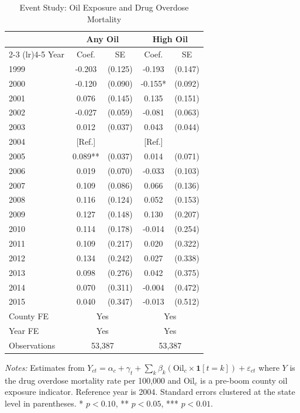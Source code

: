 \begin{table}[H]
\centering
\caption{Event Study: Oil Exposure and Drug Overdose Mortality}
\begin{threeparttable}
\begin{tabular}{lcccc}
\toprule
 & \multicolumn{2}{c}{Any Oil} & \multicolumn{2}{c}{High Oil} \\
 \cmidrule(lr){2-3} \cmidrule(lr){4-5}
Year & Coef. & SE & Coef. & SE \\
\midrule
1999 & -0.203 & (0.125) & -0.193 & (0.147) \\
2000 & -0.120 & (0.090) & -0.155* & (0.092) \\
2001 & 0.076 & (0.145) & 0.135 & (0.151) \\
2002 & -0.027 & (0.059) & -0.081 & (0.063) \\
2003 & 0.012 & (0.037) & 0.043 & (0.044) \\
2004 & [Ref.] & & [Ref.] & \\
2005 & 0.089** & (0.037) & 0.014 & (0.071) \\
2006 & 0.019 & (0.070) & -0.033 & (0.103) \\
2007 & 0.109 & (0.086) & 0.066 & (0.136) \\
2008 & 0.116 & (0.124) & 0.052 & (0.153) \\
2009 & 0.127 & (0.148) & 0.130 & (0.207) \\
2010 & 0.114 & (0.178) & -0.014 & (0.254) \\
2011 & 0.109 & (0.217) & 0.020 & (0.322) \\
2012 & 0.134 & (0.242) & 0.027 & (0.338) \\
2013 & 0.098 & (0.276) & 0.042 & (0.375) \\
2014 & 0.070 & (0.311) & -0.004 & (0.472) \\
2015 & 0.040 & (0.347) & -0.013 & (0.512) \\
\midrule
County FE & \multicolumn{2}{c}{Yes} & \multicolumn{2}{c}{Yes} \\
Year FE & \multicolumn{2}{c}{Yes} & \multicolumn{2}{c}{Yes} \\
Observations & \multicolumn{2}{c}{53,387} & \multicolumn{2}{c}{53,387} \\
\bottomrule
\end{tabular}
\begin{tablenotes}[flushleft]
\small
\item \textit{Notes:} Estimates from $Y_{ct} = \alpha_c + \gamma_t + \sum_k \beta_k (\text{Oil}_c \times \mathbf{1}[t=k]) + \varepsilon_{ct}$ where $Y$ is the drug overdose mortality rate per 100,000 and Oil$_c$ is a pre-boom county oil exposure indicator. Reference year is 2004. Standard errors clustered at the state level in parentheses. * $p<0.10$, ** $p<0.05$, *** $p<0.01$.
\end{tablenotes}
\end{threeparttable}
\label{tab:event_study}
\end{table}
